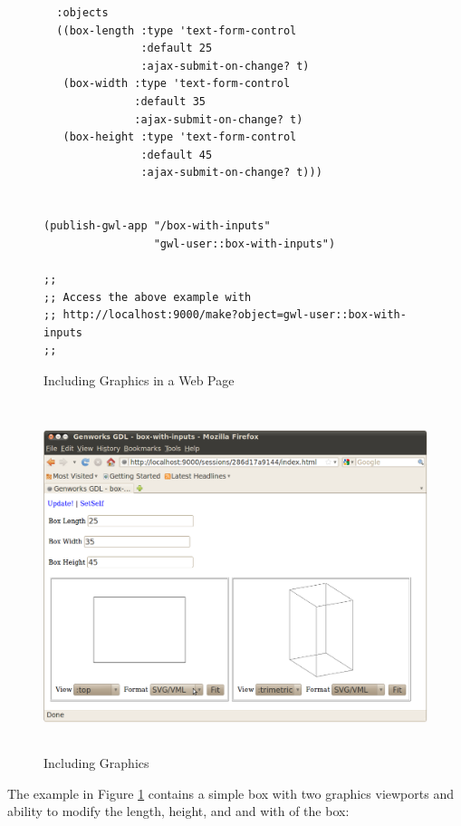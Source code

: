 \documentclass [11pt]{book}
\begin{document}
\begin{figure}
\begin{lrbox}{\boxedverb}
\begin{minipage}{\linewidth}
{\begin{verbatim}
  :objects 
  ((box-length :type 'text-form-control
               :default 25
               :ajax-submit-on-change? t)
   (box-width :type 'text-form-control
              :default 35
              :ajax-submit-on-change? t)
   (box-height :type 'text-form-control
               :default 45
               :ajax-submit-on-change? t)))


(publish-gwl-app "/box-with-inputs" 
                 "gwl-user::box-with-inputs")

;;
;; Access the above example with 
;; http://localhost:9000/make?object=gwl-user::box-with-inputs
;;

\end{verbatim}}
\end{minipage}
\end{lrbox}
\fbox{\usebox{\boxedverb}}

\caption{Including Graphics in a Web Page}

\label{fig:gwl-5}

\end{figure}

\begin{figure}
\begin{center}
\includegraphics[width=5in,height=4in]{../images/gwl-5.png}
\end{center}

\caption{Including Graphics}

\label{fig:gwl-5-image}

\end{figure}


The example in Figure 
\ref{fig:gwl-5} contains a simple box with two graphics viewports
and ability to modify the length, height, and and with of the box:
\end{document}
